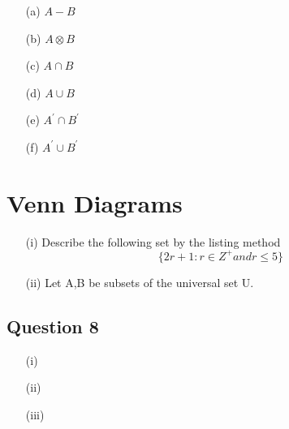 \documentclass[a4paper,12pt]{article}
\begin{document}
\begin{multicols}{2}
\begin{itemize}
	\item[(a)] $A-B$
	\item[(b)] $A \otimes B$
	\item[(c)] $A \cap B$
	\item[(d)] $A \cup B$
	\item[(e)] $A^{\prime} \cap B^{\prime}$
	\item[(f)] $A^{\prime} \cup B^{\prime}$
\end{itemize}
\end{multicols}

\newpage

\section*{Venn Diagrams}




\begin{itemize}
	\item[(i)] Describe the following set by the listing method
	\[ \{ 2r+1 : r \in Z^{+} and r \leq 5  \} \]
	\item[(ii)] Let A,B be subsets of the universal set U.
	
	
\end{itemize}

\subsection*{Question 8}
\begin{itemize}
	
	\item[(i)] 
	
	\item[(ii)]
	
	\item[(iii)]
	
\end{itemize}
\end{document}
